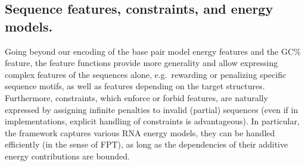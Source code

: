 \documentclass{bmcart}
\newcommand{\val}{\bar S} %
\newcommand{\Nuc}[1]{{\sf #1}}
\newcommand{\Cb}{\Nuc{C}}
\newcommand{\Gb}{\Nuc{G}}
\newcommand{\GCb}{\Gb\Cb}
\newcommand{\evalfor}[2]{#1(#2)}
\begin{document}
\subsection*{Sequence features, constraints, and energy
  models.}\label{sec:energy_models}

Going beyond our encoding of the base pair model energy features and the \GCb\% feature, the feature functions provide more generality and allow expressing complex features of the
sequences alone, e.g.\ rewarding or penalizing specific sequence
motifs, as well as features depending on the target structures.
Furthermore, constraints, which enforce or forbid features, are
naturally expressed by assigning infinite penalties to invalid
(partial) sequences (even if in implementations, explicit handling of constraints is advantageous). In particular, the framework
captures various RNA energy models, they can be handled efficiently (in the sense of FPT), as long as the dependencies of their additive energy contributions are bounded.



\end{document}
